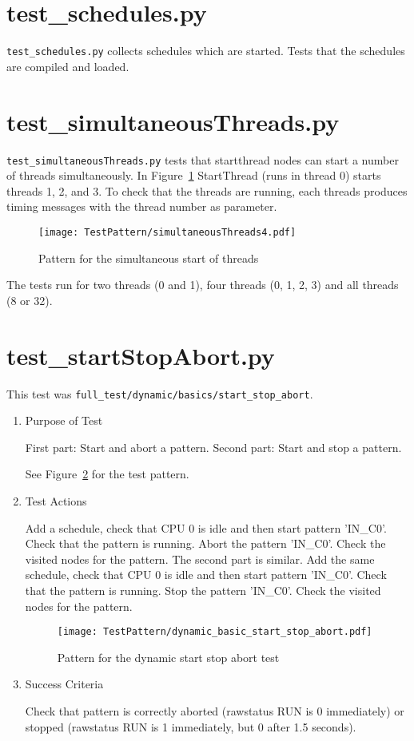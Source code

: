 \documentclass[12pt,a4paper]{report}
\begin{document}
\section{test\_schedules.py}
\texttt{test\_schedules.py} collects schedules which are started. Tests that the schedules are compiled and loaded.

\section{test\_simultaneousThreads.py}
\texttt{test\_simultaneousThreads.py} tests that startthread nodes can start a number of threads simultaneously.
In Figure~\ref{fig:Pattern_for_the_simultaneous_start_of_threads} StartThread (runs in thread 0) starts threads 1, 2, and 3.
To check that the threads are running, each threads produces timing messages with the thread number as parameter.
    \begin{figure}
        \centering
        \texttt{[image: TestPattern/simultaneousThreads4.pdf]}
        \caption{Pattern for the simultaneous start of threads}
        \label{fig:Pattern_for_the_simultaneous_start_of_threads}
    \end{figure}
The tests run for two threads (0 and 1), four threads (0, 1, 2, 3) and all threads (8 or 32).



\section{test\_startStopAbort.py}
This test was \texttt{full\_test/dynamic/basics/start\_stop\_abort}.
\begin{enumerate}
  \item Purpose of Test

    First part: Start and abort a pattern. Second part: Start and stop a pattern.

  See Figure~\ref{fig:Pattern_for_the_dynamic_start_stop_abort_test} for the test pattern.
  \item Test Actions

    Add a schedule, check that CPU 0 is idle and then start pattern 'IN\_C0'. Check that the pattern is running.
    Abort the pattern 'IN\_C0'. Check the visited nodes for the pattern. The second part is similar.
    Add the same schedule, check that CPU 0 is idle and then start pattern 'IN\_C0'. Check that the pattern is running.
    Stop the pattern 'IN\_C0'. Check the visited nodes for the pattern.
    \begin{figure}
        \centering
        \texttt{[image: TestPattern/dynamic\_basic\_start\_stop\_abort.pdf]}
        \caption{Pattern for the dynamic start stop abort test}
        \label{fig:Pattern_for_the_dynamic_start_stop_abort_test}
    \end{figure}
  \item Success Criteria

  Check that pattern is correctly aborted (rawstatus RUN is 0 immediately) or
  stopped (rawstatus RUN is 1 immediately, but 0 after 1.5 seconds).
\end{enumerate}
\end{document}
